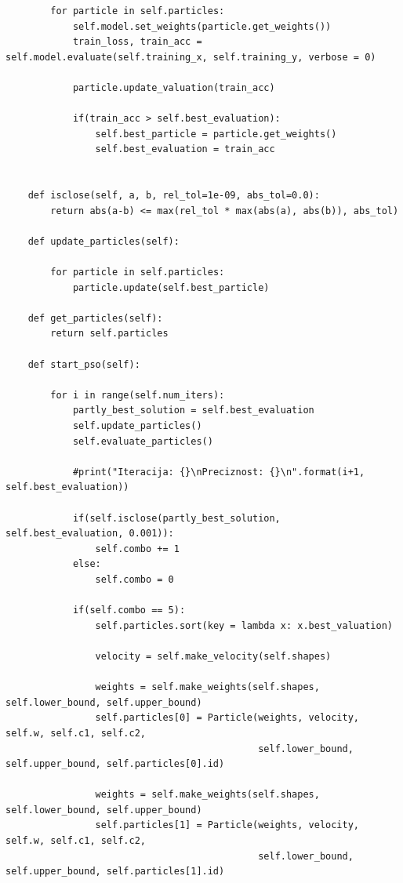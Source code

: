 \documentclass[a4paper]{article}
\begin{document}
\begin{lstlisting}
        for particle in self.particles:
            self.model.set_weights(particle.get_weights())
            train_loss, train_acc = self.model.evaluate(self.training_x, self.training_y, verbose = 0)
            
            particle.update_valuation(train_acc)
            
            if(train_acc > self.best_evaluation):
                self.best_particle = particle.get_weights()
                self.best_evaluation = train_acc
        
        
    def isclose(self, a, b, rel_tol=1e-09, abs_tol=0.0):
        return abs(a-b) <= max(rel_tol * max(abs(a), abs(b)), abs_tol)
    
    def update_particles(self):
        
        for particle in self.particles:
            particle.update(self.best_particle)
            
    def get_particles(self):
        return self.particles
    
    def start_pso(self):
        
        for i in range(self.num_iters):
            partly_best_solution = self.best_evaluation
            self.update_particles()
            self.evaluate_particles()
            
            #print("Iteracija: {}\nPreciznost: {}\n".format(i+1, self.best_evaluation))
            
            if(self.isclose(partly_best_solution, self.best_evaluation, 0.001)):
                self.combo += 1
            else:
                self.combo = 0
                
            if(self.combo == 5):
                self.particles.sort(key = lambda x: x.best_valuation)
                
                velocity = self.make_velocity(self.shapes)
                
                weights = self.make_weights(self.shapes, self.lower_bound, self.upper_bound)
                self.particles[0] = Particle(weights, velocity, self.w, self.c1, self.c2, 
                                             self.lower_bound, self.upper_bound, self.particles[0].id)
                
                weights = self.make_weights(self.shapes, self.lower_bound, self.upper_bound)
                self.particles[1] = Particle(weights, velocity, self.w, self.c1, self.c2, 
                                             self.lower_bound, self.upper_bound, self.particles[1].id)
                

\end{lstlisting}
\end{document}
